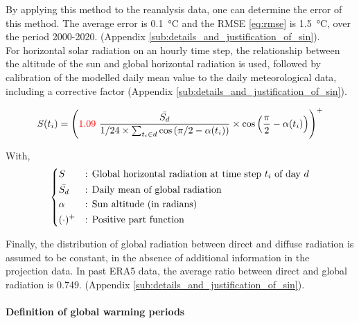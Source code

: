 \documentclass[11pt]{article}
\begin{document}
        By applying this method to the reanalysis data, one can determine the error of this method. The average error is \SI{0.1}{\celsius} and the RMSE \eqref{eq:rmse} is \SI{1.5}{\celsius}, over the period 2000-2020. (Appendix \ref{sub:details_and_justification_of_sin}). \\

        For horizontal solar radiation on an hourly time step, the relationship between the altitude of the sun and global horizontal radiation is used, followed by calibration of the modelled daily mean value to the daily meteorological data, including a corrective factor (Appendix \ref{sub:details_and_justification_of_sin}).

        \begin{equation}\label{eq:solar_eq}
             S(t_i) = \left({\color{red}1.09}~\frac{\bar{S_d}}{1/24\times\sum_{t_i \in d} \cos\left(\pi/2-\alpha(t_i)\right)} \times \cos\left(\frac{\pi}{2}-\alpha(t_i)\right)\right)^+
        \end{equation} 

        \noindent
        With,
        $$
        \begin{dcases}
            S&\text{: Global horizontal radiation at time step $t_i$ of day $d$}\\
            \bar{S_d}&\text{: Daily mean of global radiation}\\
            \alpha&\text{: Sun altitude (in radians)}\\
            (\cdot)^+&\text{: Positive part function}\\
        \end{dcases}
        $$

        Finally, the distribution of global radiation between direct and diffuse radiation is assumed to be constant, in the absence of additional information in the projection data. In past ERA5 data, the average ratio between direct and global radiation is \num{0.749}. (Appendix \ref{sub:details_and_justification_of_sin}). 

        \paragraph{Definition of global warming periods}\mbox{}\\ %
        \label{par:gw_periods}
\end{document}
